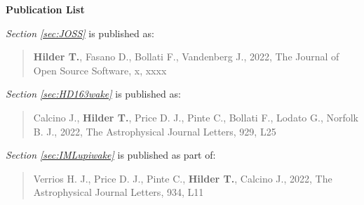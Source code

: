 \thispagestyle{plain}


\begin{center}
    
    {\Large \textbf{Publication List}}
    
\end{center}

\setlength{\parindent}{0pt}

\textit{Section \ref{sec:JOSS}} is published as:

\begin{quote}
    \textbf{Hilder T.}, Fasano D., Bollati F., Vandenberg J., 2022, The Journal of Open Source Software, x, xxxx
\end{quote}

\textit{Section \ref{sec:HD163wake}} is published as:

\begin{quote}
    Calcino J., \textbf{Hilder T.}, Price D. J., Pinte C., Bollati F., Lodato G., Norfolk B. J., 2022, The Astrophysical Journal Letters, 929, L25
\end{quote}

\textit{Section \ref{sec:IMLupiwake}} is published as part of:

\begin{quote}
    Verrios H. J., Price D. J., Pinte C., \textbf{Hilder T.}, Calcino J., 2022, The Astrophysical Journal Letters, 934, L11
\end{quote}

\setlength{\parindent}{15pt}
\newpage